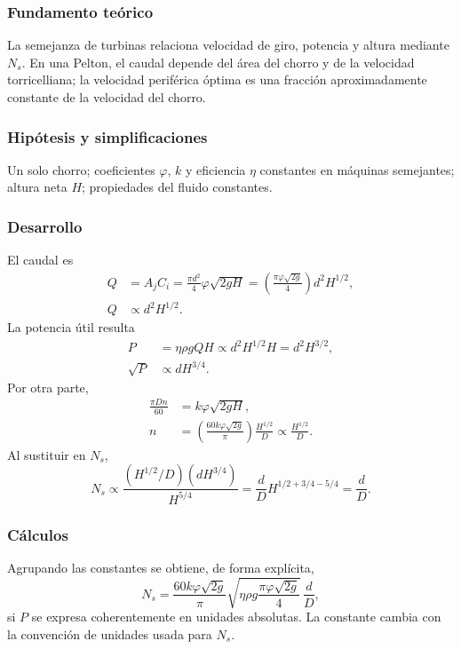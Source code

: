 \documentclass[12pt]{article}
\begin{document}
\subsubsection*{Fundamento teórico}
La semejanza de turbinas relaciona velocidad de giro, potencia y altura mediante $N_s$.
En una Pelton, el caudal depende del área del chorro y de la velocidad torricelliana; la
velocidad periférica óptima es una fracción aproximadamente constante de la velocidad del
chorro.

\subsubsection*{Hipótesis y simplificaciones}
Un solo chorro; coeficientes $\varphi$, $k$ y eficiencia $\eta$ constantes en máquinas
semejantes; altura neta $H$; propiedades del fluido constantes.

\subsubsection*{Desarrollo}
El caudal es
\begin{align*}
Q&=A_jC_i
=\frac{\pi d^2}{4}\varphi\sqrt{2gH}
=\left(\frac{\pi\varphi\sqrt{2g}}{4}\right)d^2H^{1/2},\\
Q&\propto d^2H^{1/2}.
\end{align*}
La potencia útil resulta
\begin{align*}
P&=\eta\rho gQH
\propto d^2H^{1/2}H=d^2H^{3/2},\\
\sqrt{P}&\propto dH^{3/4}.
\end{align*}
Por otra parte,
\begin{align*}
\frac{\pi Dn}{60}&=k\varphi\sqrt{2gH},\\
n&=\left(\frac{60k\varphi\sqrt{2g}}{\pi}\right)\frac{H^{1/2}}{D}
\propto\frac{H^{1/2}}{D}.
\end{align*}
Al sustituir en $N_s$,
\[
N_s\propto
\frac{(H^{1/2}/D)(dH^{3/4})}{H^{5/4}}
=\frac{d}{D}H^{1/2+3/4-5/4}=\frac{d}{D}.
\]

\subsubsection*{Cálculos}
Agrupando las constantes se obtiene, de forma explícita,
\[
N_s=\frac{60k\varphi\sqrt{2g}}{\pi}
\sqrt{\eta\rho g\frac{\pi\varphi\sqrt{2g}}{4}}\,\frac{d}{D},
\]
si $P$ se expresa coherentemente en unidades absolutas. La constante cambia con la
convención de unidades usada para $N_s$.
\end{document}
